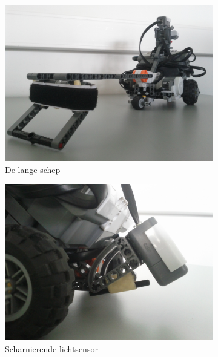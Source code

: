 \documentclass[eind]{penoverslag}
\begin{document}
\begin{figure}
\centering
	\begin{subfigure}[h]{0.325\textwidth}
	\centering
		\includegraphics[width=\textwidth]{schepGroot}
		\caption{De lange schep}
	\end{subfigure}
	\begin{subfigure}[h]{0.325\textwidth}
		\centering
		\includegraphics[width=\textwidth]{lichtsensor}
		\caption{Scharnierende lichtsensor}
	\end{subfigure}
	\begin{subfigure}[h]{0.325\textwidth}
		\centering

\end{subfigure}
\end{figure}
\end{document}
